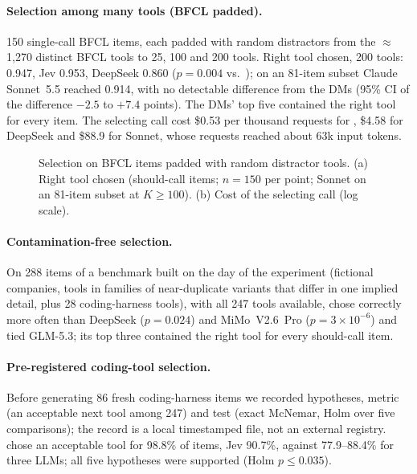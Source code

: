 \paragraph{Selection among many tools (BFCL padded).} 150 single-call BFCL items, each padded with random
distractors from the $\approx$1{,}270 distinct BFCL tools to 25, 100 and 200 tools. Right tool chosen, 200 tools:
\msd{} 0.947, Jev 0.953, DeepSeek 0.860 ($p=0.004$ vs.\ \msd{}); on an 81-item subset Claude Sonnet~5.5 reached
0.914, with no detectable difference from the DMs (95\% CI of the difference $-2.5$ to $+7.4$ points). The DMs'
top five contained the right tool for every item. The selecting call cost \$0.53 per thousand requests for
\msd{}, \$4.58 for DeepSeek and \$88.9 for Sonnet, whose requests reached about 63k input tokens.

\begin{figure}[h]
\centering
\resizebox{\linewidth}{!}{}
\caption{Selection on BFCL items padded with random distractor tools. (a) Right tool chosen (should-call items;
$n=150$ per point; Sonnet on an 81-item subset at $K\ge100$). (b) Cost of the selecting call (log scale).}
\label{fig:scaling}
\end{figure}

\paragraph{Contamination-free selection.} On 288 items of a benchmark built on the day of the experiment
(fictional companies, tools in families of near-duplicate variants that differ in one implied detail, plus 28
coding-harness tools), with all 247 tools available, \msd{} chose correctly more often than DeepSeek ($p=0.024$)
and MiMo~V2.6~Pro ($p=3\times10^{-6}$) and tied GLM-5.3; its top three contained the right tool for every
should-call item.

\paragraph{Pre-registered coding-tool selection.} Before generating 86 fresh coding-harness items we recorded
hypotheses, metric (an acceptable next tool among 247) and test (exact McNemar, Holm over five comparisons); the
record is a local timestamped file, not an external registry. \msd{} chose an acceptable tool for 98.8\% of
items, Jev 90.7\%, against 77.9--88.4\% for three LLMs; all five hypotheses were supported (Holm $p\le0.035$).

